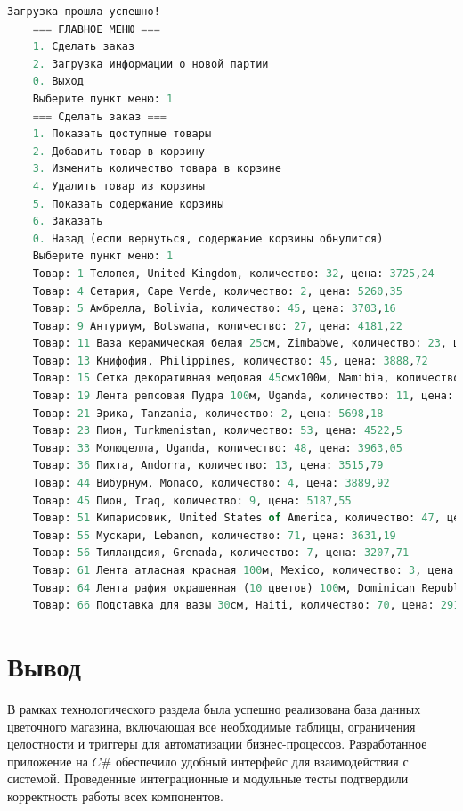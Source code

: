 \begin{lstlisting}[label=lst:prog_load, caption=Загрузка информации о новой партии товара, language=SQL]
	Загрузка прошла успешно!
	=== ГЛАВНОЕ МЕНЮ ===
	1. Сделать заказ
	2. Загрузка информации о новой партии
	0. Выход
	Выберите пункт меню: 1
	=== Сделать заказ ===
	1. Показать доступные товары
	2. Добавить товар в корзину
	3. Изменить количество товара в корзине
	4. Удалить товар из корзины
	5. Показать содержание корзины
	6. Заказать
	0. Назад (если вернуться, содержание корзины обнулится)
	Выберите пункт меню: 1
	Товар: 1 Телопея, United Kingdom, количество: 32, цена: 3725,24
	Товар: 4 Сетария, Cape Verde, количество: 2, цена: 5260,35
	Товар: 5 Амбрелла, Bolivia, количество: 45, цена: 3703,16
	Товар: 9 Антуриум, Botswana, количество: 27, цена: 4181,22
	Товар: 11 Ваза керамическая белая 25см, Zimbabwe, количество: 23, цена: 6872,71
	Товар: 13 Книфофия, Philippines, количество: 45, цена: 3888,72
	Товар: 15 Сетка декоративная медовая 45смx100м, Namibia, количество: 60, цена: 4255,04
	Товар: 19 Лента репсовая Пудра 100м, Uganda, количество: 11, цена: 4667,08
	Товар: 21 Эрика, Tanzania, количество: 2, цена: 5698,18
	Товар: 23 Пион, Turkmenistan, количество: 53, цена: 4522,5
	Товар: 33 Молюцелла, Uganda, количество: 48, цена: 3963,05
	Товар: 36 Пихта, Andorra, количество: 13, цена: 3515,79
	Товар: 44 Вибурнум, Monaco, количество: 4, цена: 3889,92
	Товар: 45 Пион, Iraq, количество: 9, цена: 5187,55
	Товар: 51 Кипарисовик, United States of America, количество: 47, цена: 4526,53
	Товар: 55 Мускари, Lebanon, количество: 71, цена: 3631,19
	Товар: 56 Тилландсия, Grenada, количество: 7, цена: 3207,71
	Товар: 61 Лента атласная красная 100м, Mexico, количество: 3, цена: 3909,84
	Товар: 64 Лента рафия окрашенная (10 цветов) 100м, Dominican Republic, количество: 1, цена: 5139,66
	Товар: 66 Подставка для вазы 30см, Haiti, количество: 70, цена: 2917,62
\end{lstlisting}
\section*{Вывод}
В рамках технологического раздела была успешно реализована база данных цветочного магазина, включающая все необходимые таблицы, ограничения целостности и триггеры для автоматизации бизнес-процессов. Разработанное приложение на $C\#$ обеспечило удобный интерфейс для взаимодействия с системой. Проведенные интеграционные и модульные тесты подтвердили корректность работы всех компонентов.
